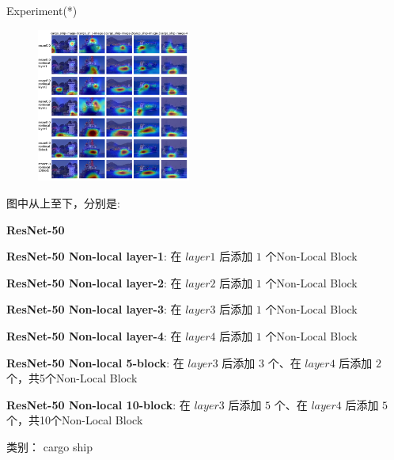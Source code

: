 \begin{frame}{Experiment(*)}
    \begin{multicols}{2}
        \begin{figure}
            \centering
            \includegraphics[width=0.45\textwidth]{docs/paperReading/Non-local/exp/cargo_ship.png}
        \end{figure}

        \begin{scriptsize}
            图中从上至下，分别是:

            \begin{tiny}
                \textbf{ResNet-50}

                \textbf{ResNet-50 Non-local layer-1}: 在 $layer1$ 后添加 $1$ 个Non-Local Block

                \textbf{ResNet-50 Non-local layer-2}: 在 $layer2$ 后添加 $1$ 个Non-Local Block

                \textbf{ResNet-50 Non-local layer-3}: 在 $layer3$ 后添加 $1$ 个Non-Local Block
                
                \textbf{ResNet-50 Non-local layer-4}: 在 $layer4$ 后添加 $1$ 个Non-Local Block
                
                \textbf{ResNet-50 Non-local 5-block}: 在 $layer3$ 后添加 $3$ 个、在 $layer4$ 后添加 $2$ 个，共5个Non-Local Block
                
                \textbf{ResNet-50 Non-local 10-block}: 在 $layer3$ 后添加 $5$ 个、在 $layer4$ 后添加 $5$ 个，共10个Non-Local Block
            \end{tiny}

            类别： cargo ship 
        \end{scriptsize}
    \end{multicols}
\end{frame}